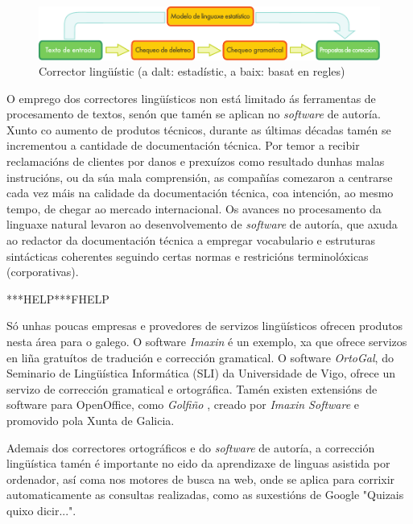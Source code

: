 \begin{multicols}{2}
 \begin{figure}[htb]
  \vspace{-9mm}
  \center
  \includegraphics[width=\textwidth]{../_media/galician/language_checking}
  \caption{Corrector lingüístic (a dalt: estadístic, a baix: basat en regles)}
  \label{fig:langcheckingaarch_ca}
\end{figure}

O emprego dos correctores lingüísticos non está limitado ás ferramentas de procesamento de textos, senón que tamén se aplican no \textit{software} de autoría. Xunto co aumento de produtos técnicos, durante as últimas décadas tamén se incrementou a cantidade de documentación técnica. Por temor a recibir reclamacións de clientes por danos e prexuízos como resultado dunhas malas instrucións, ou da súa mala comprensión, as compañías comezaron a centrarse cada vez máis na calidade da documentación técnica, coa intención, ao mesmo tempo, de chegar ao mercado internacional. Os avances no procesamento da linguaxe natural levaron ao desenvolvemento de \textit{software} de autoría, que axuda ao redactor da documentación técnica a empregar vocabulario e estruturas sintácticas coherentes seguindo certas normas e restricións terminolóxicas (corporativas). 

***HELP***FHELP


Só unhas poucas empresas e provedores de servizos lingüísticos ofrecen produtos nesta área para o galego. O software \textit{Imaxin} \cite{GAL-Nota21}  é un exemplo, xa que ofrece servizos en liña gratuítos de tradución e corrección gramatical. O software \textit{OrtoGal}, do Seminario de Lingüística Informática (SLI) \cite{GAL-Nota22} da Universidade de Vigo, ofrece un servizo de corrección gramatical e ortográfica. Tamén existen extensións de software para OpenOffice, como \textit{Golfiño} \cite{GAL-Nota23}, creado por \textit{Imaxin Software} e promovido pola Xunta de Galicia.

Ademais dos correctores ortográficos e do \textit{software} de autoría, a corrección lingüística tamén é importante no eido da aprendizaxe de linguas asistida por ordenador, así coma nos motores de busca na web, onde se aplica para corrixir automaticamente as consultas realizadas, como as suxestións de Google "Quizais quixo dicir...". 



\end{multicols}
